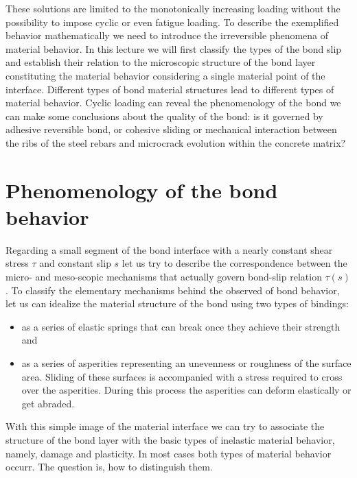 \documentclass[main.tex]{subfiles}
\begin{document}
These solutions are limited to the monotonically increasing loading without the possibility to impose cyclic or even fatigue loading. To describe the exemplified behavior mathematically we need to introduce the irreversible phenomena of material  behavior. 
In this lecture we will first classify the types of the bond slip and establish their relation to the microscopic structure of the bond layer constituting the material behavior considering a single material point of the interface. Different types of bond material structures lead  to different types of material behavior. Cyclic loading can reveal the phenomenology of the bond we can make some conclusions about the quality of the bond: is it governed by adhesive reversible bond, or cohesive sliding or mechanical interaction between the ribs of the steel rebars and microcrack evolution within the concrete matrix?

\section{Phenomenology of the bond behavior}
Regarding a small segment of the bond interface with a nearly constant shear stress $\tau$ and constant 
slip $s$ let us try to describe the correspondence between the micro- and meso-scopic mechanisms that actually govern 
bond-slip relation $\tau(s)$. To classify the elementary mechanisms behind the observed of bond behavior, let us can idealize 
the material structure of the bond using two types of bindings:
\begin{itemize}
    \item 
as a series of elastic springs that can break once they achieve their strength 
and 
    \item
as a series of asperities representing an unevenness or roughness of the surface area. 
Sliding of these surfaces is accompanied with a stress required to cross over the asperities. 
During this process the asperities can deform elastically or get abraded.
\end{itemize}
With this simple image of the material interface we can try to associate the structure of the bond
layer with the basic types of inelastic material behavior, namely, damage and plasticity. In most cases
both types of material behavior occurr. The question is, how to distinguish them.
\end{document}

